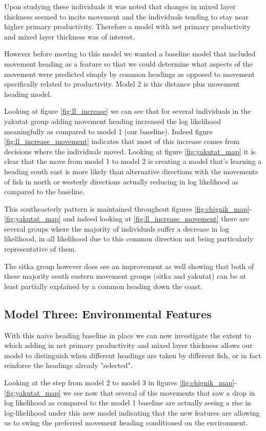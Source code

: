 \documentclass[11pt]{article}
\begin{document}
Upon studying these individuals it was noted that changes in mixed layer thickness seemed to incite movement and the individuals tending to stay near higher primary productivity. Therefore a model with net primary productivity and mixed layer thickness was of interest. 

However before moving to this model we wanted a baseline model that included movement heading as a feature so that we could determine what aspects of the movement were predicted simply by common headings as opposed to movement specifically related to productivity. Model 2 is this distance plus movement heading model. 

Looking at figure \ref{fig:ll_increase} we can see that for several individuals in the yakutat group adding movement heading increased the log likelihood meaningfully as compared to model 1 (our baseline). 
Indeed figure \ref{fig:ll_increase_movement} indicates that most of this increase comes from decisions where the individuals moved. Looking at figure \ref{fig:yakutat_map} it is clear that the move from model 1 to model 2 is creating a model that's learning a heading south east is more likely than alternative directions with the movements of fish in north or westerly directions actually reducing in log likelihood as compared to the baseline. 

This southeasterly pattern is maintained throughout figures \ref{fig:chignik_map}-\ref{fig:yakutat_map} and indeed looking at \ref{fig:ll_increase_movement} there are several groups where the majority of individuals suffer a decrease in log likelihood, in all likelihood due to this common direction not being particularly representative of them.  

The sitka group however does see an improvement as well showing that both of these majority south eastern movement groups (sitka and yakutat) can be at least partially explained by a common heading down the coast. 

\subsection*{Model Three: Environmental Features}
With this naive heading baseline in place we can now investigate the extent to which adding in net primary productivity and mixed layer thickness allows our model to distinguish when different headings are taken by different fish, or in fact reinforce the headings already "selected". 

Looking at the step from model 2 to model 3 in figures \ref{fig:chignik_map}-\ref{fig:yakutat_map} we see now that several of the movements that saw a drop in log likelihood as compared to the model 1 baseline are actually seeing a rise in log-likelihood under this new model indicating that the new features are allowing us to swing the preferred movement heading conditioned on the environment. 
\end{document}
